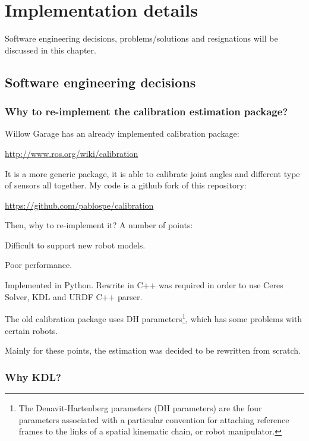 \chapter{Implementation details}
\label{cha:implementation}

Software engineering decisions, problems/solutions and resignations will be discussed in this chapter.

\section{Software engineering decisions}

\subsection{Why to re-implement the calibration estimation package?}

Willow Garage has an already implemented calibration package:

\url{http://www.ros.org/wiki/calibration}

\noindent
It is a more generic package, it is able to calibrate joint angles and different type of sensors all together.
My code is a github fork of this repository:

\url{https://github.com/pablospe/calibration}

\noindent
Then, why to re-implement it? A number of points: %
\begin{itemize*}
 \item Difficult to support new robot models.
 \item Poor performance.
 \item Implemented in Python. Rewrite in C++ was required in order to use Ceres Solver, KDL and URDF C++ parser.
 \item The old calibration package uses DH parameters\footnote{The Denavit-Hartenberg parameters (DH parameters) are the four parameters associated with a particular convention for attaching reference frames to the links of a spatial kinematic chain, or robot manipulator.}, which has some problems with certain robots.
\end{itemize*}

Mainly for these points, the estimation was decided to be rewritten from scratch.



\subsection{Why KDL?}

